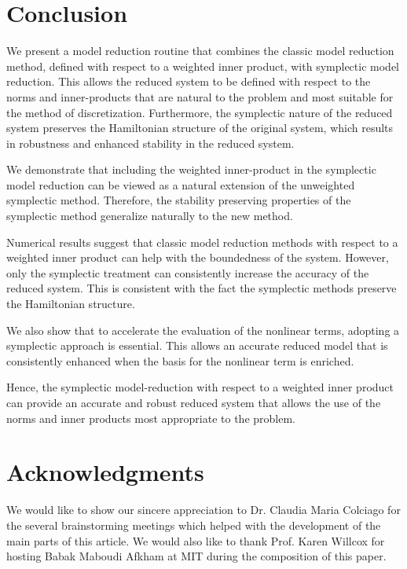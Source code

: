 \section{Conclusion} \label{sec:conc}
We present a model reduction routine that combines the classic model reduction method, defined with respect to a weighted inner product, with symplectic model reduction. This allows the reduced system to be defined with respect to the norms and inner-products that are natural to the problem and most suitable for the method of discretization. Furthermore, the symplectic nature of the reduced system preserves the Hamiltonian structure of the original system, which results in robustness and enhanced stability in the reduced system.

We demonstrate that including the weighted inner-product in the symplectic model reduction can be viewed as a natural extension of the unweighted symplectic method. Therefore, the stability preserving properties of the symplectic method generalize naturally to the new method.

Numerical results suggest that classic model reduction methods with respect to a weighted inner product can help with the boundedness of the system. However, only the symplectic treatment can consistently increase the accuracy of the reduced system. This is consistent with the fact the symplectic methods preserve the Hamiltonian structure.

We also show that to accelerate the evaluation of the nonlinear terms, adopting a symplectic approach is essential. This allows an accurate reduced model that is consistently enhanced when the basis for the nonlinear term is enriched.

Hence, the symplectic model-reduction with respect to a weighted inner product can provide an accurate and robust reduced system that allows the use of the norms and inner products most appropriate to the problem.

\section*{Acknowledgments} We would like to show our sincere appreciation to Dr. Claudia Maria Colciago for the several brainstorming meetings which helped with the development of the main parts of this article. We would also like to thank Prof. Karen Willcox for hosting Babak Maboudi Afkham at MIT during the composition of this paper. 
